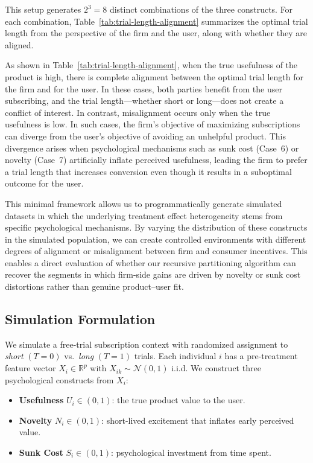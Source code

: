 \documentclass[11pt,letterpaper,english]{article}
\theoremstyle{definition}
\theoremstyle{definition}
\begin{document}
\begin{bibunit}
This setup generates $2^3 = 8$ distinct combinations of the three constructs. For each combination, Table~\ref{tab:trial-length-alignment} summarizes the optimal trial length from the perspective of the firm and the user, along with whether they are aligned. 

As shown in Table~\ref{tab:trial-length-alignment}, when the true usefulness of the product is high, there is complete alignment between the optimal trial length for the firm and for the user. In these cases, both parties benefit from the user subscribing, and the trial length—whether short or long—does not create a conflict of interest. In contrast, misalignment occurs only when the true usefulness is low. In such cases, the firm's objective of maximizing subscriptions can diverge from the user's objective of avoiding an unhelpful product. This divergence arises when psychological mechanisms such as sunk cost (Case~6) or novelty (Case~7) artificially inflate perceived usefulness, leading the firm to prefer a trial length that increases conversion even though it results in a suboptimal outcome for the user.




This minimal framework allows us to programmatically generate simulated datasets in which the underlying treatment effect heterogeneity stems from specific psychological mechanisms. By varying the distribution of these constructs in the simulated population, we can create controlled environments with different degrees of alignment or misalignment between firm and consumer incentives. This enables a direct evaluation of whether our recursive partitioning algorithm can recover the segments in which firm-side gains are driven by novelty or sunk cost distortions rather than genuine product--user fit.


\subsection{Simulation Formulation}
\label{sec:simulation-formulation}

We simulate a free-trial subscription context with randomized assignment to \emph{short} $(T=0)$ vs.\ \emph{long} $(T=1)$ trials. Each individual $i$ has a pre-treatment feature vector $X_i\in\mathbb{R}^p$ with $X_{ik}\sim \mathcal{N}(0,1)$ i.i.d. We construct three psychological constructs from $X_i$:

\begin{itemize}
    \item \textbf{Usefulness} $U_i \in (0,1)$: the true product value to the user.
    \item \textbf{Novelty} $N_i \in (0,1)$: short-lived excitement that inflates early perceived value.
    \item \textbf{Sunk Cost} $S_i \in (0,1)$: psychological investment from time spent.
\end{itemize}


\end{bibunit}
\end{document}
